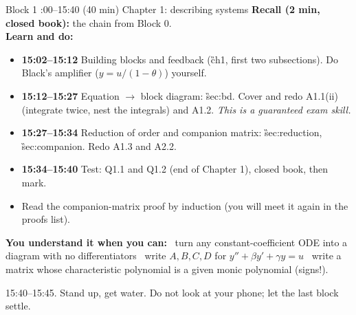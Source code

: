 \begin{sessionbox}{Block 1 :00--15:40 (40 min) \quad Chapter 1: describing systems}
\textbf{Recall (2 min, closed book):} the chain from Block 0.\\
\textbf{Learn and do:}
\begin{itemize}
\item[\core] \textbf{15:02--15:12} Building blocks and feedback (\G{ch1}, first two subsections). Do Black's amplifier ($y=u/(1-\theta)$) yourself.
\item[\core] \textbf{15:12--15:27} Equation $\to$ block diagram: \G{sec:bd}. Cover and redo A1.1(ii) (integrate twice, nest the integrals) and A1.2. \emph{This is a guaranteed exam skill.}
\item[\core] \textbf{15:27--15:34} Reduction of order and companion matrix: \G{sec:reduction}, \G{sec:companion}. Redo A1.3 and A2.2.
\item[\core] \textbf{15:34--15:40} Test: Q1.1 and Q1.2 (end of Chapter 1), closed book, then mark.
\item[\extra] Read the companion-matrix proof by induction (you will meet it again in the proofs list).
\end{itemize}
\textbf{You understand it when you can:}
\tick\ turn any constant-coefficient ODE into a diagram with no differentiators \quad
\tick\ write $A,B,C,D$ for $y''+\beta y'+\gamma y=u$ \quad
\tick\ write a matrix whose characteristic polynomial is a given monic polynomial (signs!).
\end{sessionbox}

\begin{breakbox}15:40--15:45. Stand up, get water. Do not look at your phone; let the last block settle.\end{breakbox}

